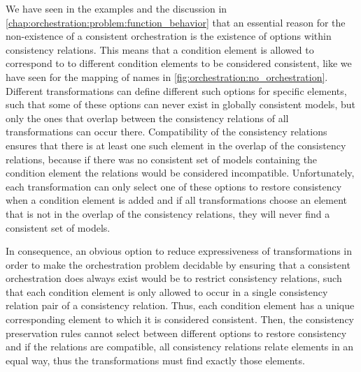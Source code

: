 We have seen in the examples and the discussion in \autoref{chap:orchestration:problem:function_behavior} that an essential reason for the non-existence of a consistent orchestration is the existence of options within consistency relations.
This means that a condition element is allowed to correspond to to different condition elements to be considered consistent, like we have seen for the mapping of names in \autoref{fig:orchestration:no_orchestration}.
Different transformations can define different such options for specific elements, such that some of these options can never exist in globally consistent models, but only the ones that overlap between the consistency relations of all transformations can occur there.
Compatibility of the consistency relations ensures that there is at least one such element in the overlap of the consistency relations, because if there was no consistent set of models containing the condition element the relations would be considered incompatible.
Unfortunately, each transformation can only select one of these options to restore consistency when a condition element is added and if all transformations choose an element that is not in the overlap of the consistency relations, they will never find a consistent set of models.

In consequence, an obvious option to reduce expressiveness of transformations in order to make the orchestration problem decidable by ensuring that a consistent orchestration does always exist would be to restrict consistency relations, such that each condition element is only allowed to occur in a single consistency relation pair of a consistency relation.
Thus, each condition element has a unique corresponding element to which it is considered consistent.
Then, the consistency preservation rules cannot select between different options to restore consistency and if the relations are compatible, all consistency relations relate elements in an equal way, thus the transformations must find exactly those elements.

